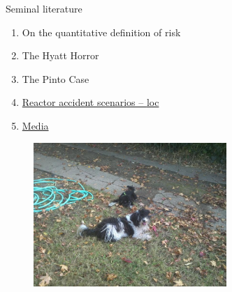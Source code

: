 \documentclass[aspectratio=1610,pdftex,dvipsnames,compress,xcolor={dvipsnames}]{beamer}
\newcommand{\acs}{\acrshort} %
\begin{document}
\begin{frame}{Seminal literature}
    \begin{enumerate}[series=outerlist,topsep=0pt,itemsep=21pt,leftmargin=*,label=(\arabic*)]
        \item[]On the quantitative definition of risk
        \item[]The Hyatt Horror
        \item[]The Pinto Case
        \item[]\href{https://uidaho.pressbooks.pub/riskassessment/chapter/pra-2/}{Reactor accident scenarios -- \acs{loc}}
        \item[]\href{https://uidaho.pressbooks.pub/riskassessment/chapter/contemporary-cases-in-risk-assessment-2/}{Media}
    \end{enumerate}
\end{frame}


\begin{frame}[plain]{}
    \begin{figure}
        \centering
        \includegraphics[width=0.65\textwidth]{final.jpg}
    \end{figure}
\end{frame}


%
%
%



%    
%    
\end{document}

